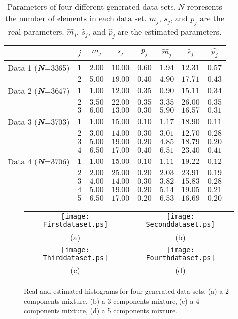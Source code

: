 \documentclass[journal,10pt]{elsart}
\begin{document}
\begin{table}[ht!]
\begin{center}
\caption{Parameters of four different generated data sets. $N$
represents the number of elements in each data set. $m_j$, $s_j$, and $p_j$ are the real parameters. $\hat{m}_j$,
$\hat{s}_j$, and $\hat{p}_j$ are the estimated
parameters. \label{tab2}}
\tiny
\begin{tabular}{|c| c| c| c| c| c| c| c| }
  \hline
&$j$ &$m_j$ &$s_j$&$p_j$ &$\hat{m}_j$&$\hat{s}_j$&$\hat{p_j}$\\
\hline
Data 1 {(\textbf{\emph{N}}=3365)} &$1$ &$2.00$ &$10.00$ &$0.60$ &$1.94$ &$12.31$&$0.57$\\
&$2$ &$5.00$ &$19.00$ &$0.40$ &$4.90$ &$17.71$&$0.43$\\
\hline
Data 2 {(\textbf{\emph{N}}=3647)} &$1$ &$1.00$ &$12.00$ &$0.35$ &$0.90$ &$15.11$&$0.34$\\
 &$2$ &$3.50$ &$22.00$ &$0.35$ &$3.35$ &$26.00$&$0.35$\\
 &$3$ &$6.00$ &$13.00$ &$0.30$ &$5.90$ &$16.57$&$0.31$\\
 \hline
Data 3 {(\textbf{\emph{N}}=3703)} &$1$ &$1.00$ &$15.00$ &$0.10$ &$1.17$ &$18.90$&$0.11$\\
 &$2$ &$3.00$ &$14.00$ &$0.30$ &$3.01$ &$12.70$&$0.28$\\
 &$3$ &$5.00$ &$19.00$ &$0.20$ &$4.85$ &$18.79$&$0.20$\\
 &$4$ &$6.50$ &$17.00$ &$0.40$ &$6.51$ &$23.40$&$0.41$\\
  \hline
Data 4 {(\textbf{\emph{N}}=3706)} &$1$ &$1.00$ &$15.00$ &$0.10$ &$1.11$ &$19.22$&$0.12$\\
 &$2$ &$2.00$ &$25.00$ &$0.20$ &$2.03$ &$23.91$&$0.19$\\
 &$3$ &$4.00$ &$14.00$ &$0.30$ &$3.82$ &$15.83$&$0.28$\\
 &$4$ &$5.00$ &$19.00$ &$0.20$ &$5.14$ &$19.05$&$0.21$\\
 &$5$ &$6.50$ &$17.00$ &$0.20$ &$6.53$ &$16.69$&$0.20$\\
  \hline
\end{tabular}
\end{center}
\end{table}
\begin{figure}[!h]
\begin{center}
\begin{tabular}{cc}
\texttt{[image: Firstdataset.ps]} & \texttt{[image: Seconddataset.ps]}\\
(a)&(b)\\
\texttt{[image: Thirddataset.ps]} & \texttt{[image: Fourthdataset.ps]}\\
(c)&(d)\\
\end{tabular}
\end{center}
\caption{Real and estimated histograms for four generated data
sets. (a) a 2 components mixture,
(b) a 3 components mixture, (c) a 4 components mixture, (d) a 5 components mixture.}\label{fig:3}
\end{figure}
\end{document}
